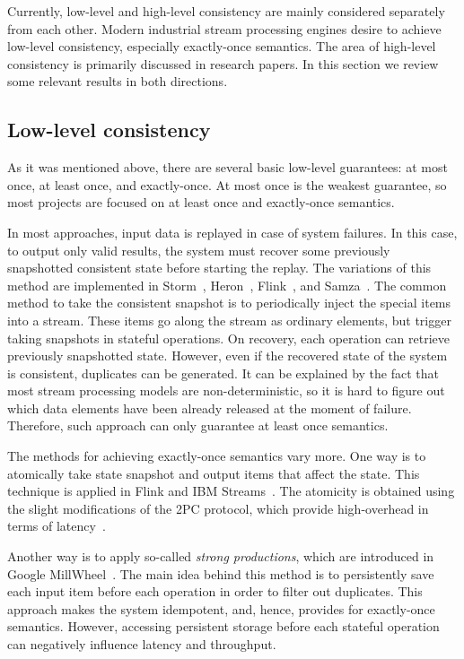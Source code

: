 \label{fs-phd-related}

Currently, low-level and high-level consistency are mainly considered separately from each other. Modern industrial stream processing engines desire to achieve low-level consistency, especially exactly-once semantics. The area of high-level consistency is primarily discussed in research papers. In this section we review some relevant results in both directions. 

\subsection{Low-level consistency}
As it was mentioned above, there are several basic low-level guarantees: at most once, at least once, and exactly-once. At most once is the weakest guarantee, so most projects are focused on at least once and exactly-once semantics.

In most approaches, input data is replayed in case of system failures. In this case, to output only valid results, the system must recover some previously snapshotted consistent state before starting the replay. The variations of this method are implemented in Storm~\cite{apache:storm}, Heron~\cite{Kulkarni:2015:THS:2723372.2742788}, Flink~\cite{Carbone:2017:SMA:3137765.3137777}, and Samza~\cite{Noghabi:2017:SSS:3137765.3137770}. The common method to take the consistent snapshot is to periodically inject the special items into a stream. These items go along the stream as ordinary elements, but trigger taking snapshots in stateful operations. On recovery, each operation can retrieve previously snapshotted state. However, even if the recovered state of the system is consistent, duplicates can be generated. It can be explained by the fact that most stream processing models are non-deterministic, so it is hard to figure out which data elements have been already released at the moment of failure. Therefore, such approach can only guarantee at least once semantics. 

The methods for achieving exactly-once semantics vary more. One way is to atomically take state snapshot and output items that affect the state. This technique is applied in Flink and IBM Streams~\cite{jacques2016consistent}. The atomicity is obtained using the slight modifications of the 2PC protocol, which provide high-overhead in terms of latency~\cite{we2018beyondmr}.

Another way is to apply so-called {\em strong productions}, which are introduced in Google MillWheel~\cite{Akidau:2013:MFS:2536222.2536229}. The main idea behind this method is to persistently save each input item before each operation in order to filter out duplicates. This approach makes the system idempotent, and, hence, provides for exactly-once semantics. However, accessing persistent storage before each stateful operation can negatively influence latency and throughput.

